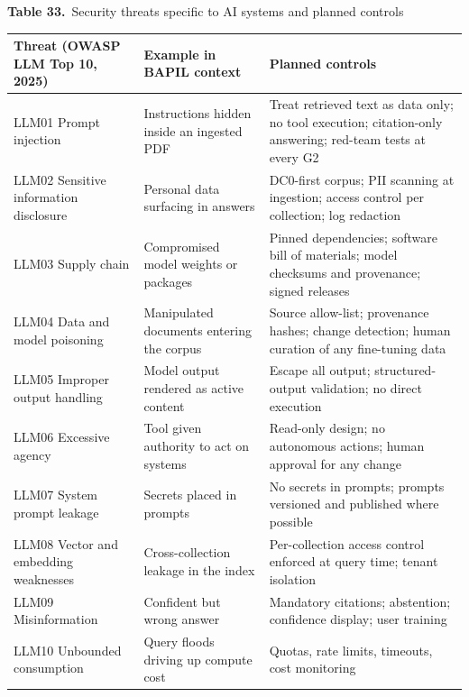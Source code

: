 \documentclass[border=10pt]{standalone}
\begin{document}
\begin{minipage}{17cm}
{\large\bfseries Table 33.}\ {\large Security threats specific to AI systems and planned controls}\par\vspace{7pt}
\small
{}
\begin{tabularx}{\linewidth}{@{}>{\hsize=0.732\hsize\raggedright\arraybackslash}X>{\hsize=0.805\hsize\raggedright\arraybackslash}X>{\hsize=1.463\hsize\raggedright\arraybackslash}X@{}}
\arrayrulecolor{bapilrule}\toprule
\rowcolor{white}\textbf{Threat (OWASP LLM Top 10, 2025)} & \textbf{Example in BAPIL context} & \textbf{Planned controls} \\
\midrule
LLM01 Prompt injection & Instructions hidden inside an ingested PDF & Treat retrieved text as data only; no tool execution; citation-only answering; red-team tests at every G2 \\
LLM02 Sensitive information disclosure & Personal data surfacing in answers & DC0-first corpus; PII scanning at ingestion; access control per collection; log redaction \\
LLM03 Supply chain & Compromised model weights or packages & Pinned dependencies; software bill of materials; model checksums and provenance; signed releases \\
LLM04 Data and model poisoning & Manipulated documents entering the corpus & Source allow-list; provenance hashes; change detection; human curation of any fine-tuning data \\
LLM05 Improper output handling & Model output rendered as active content & Escape all output; structured-output validation; no direct execution \\
LLM06 Excessive agency & Tool given authority to act on systems & Read-only design; no autonomous actions; human approval for any change \\
LLM07 System prompt leakage & Secrets placed in prompts & No secrets in prompts; prompts versioned and published where possible \\
LLM08 Vector and embedding weaknesses & Cross-collection leakage in the index & Per-collection access control enforced at query time; tenant isolation \\
LLM09 Misinformation & Confident but wrong answer & Mandatory citations; abstention; confidence display; user training \\
LLM10 Unbounded consumption & Query floods driving up compute cost & Quotas, rate limits, timeouts, cost monitoring \\
\bottomrule
\end{tabularx}
\par{}
\end{minipage}
\end{document}
